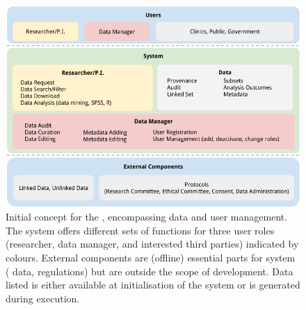 \begin{figure}[h]
	\centering
	\includegraphics[width=0.98\linewidth]{images/brainstorm-before}
	\caption{
		Initial concept for the \ivfsystem{}, encompassing data and user management. 
		The system offers different sets of functions for three user roles (researcher, data manager, and interested third parties) indicated by colours. 
		External components are (offline) essential parts for system (\eg{} data, regulations) but are outside the scope of development.
		Data listed is either available at initialisation of the system or is generated during execution.
	}
	\label{fig:brainstorm-before}
\end{figure}